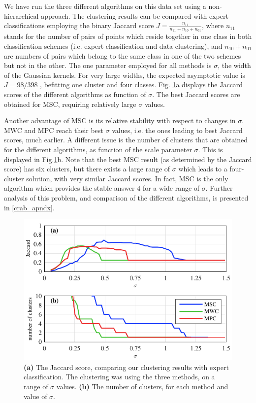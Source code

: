 \documentclass[preprint,12pt]{elsarticle}
\begin{document}
We have run the three different algorithms on this data set using a non-hierarchical approach. The clustering results can be compared with expert classifications \cite{ripley1996} employing the binary Jaccard score $J=\frac{n_{11}}{n_{11}+n_{10}+n_{01}}$, where $n_{11}$ stands for the number of pairs of points which reside together in one class in both classification schemes (i.e. expert classification and data clustering), and $n_{10}+n_{01}$ are numbers of pairs which belong to the same class in one of the two schemes but not in the other. The one parameter employed for all methods is $\sigma$, the width of the Gaussian kernels. For very large widths, the expected asymptotic value is $J=98/398$ , befitting one cluster and four classes. Fig. \ref{crabs}a displays the Jaccard scores of the different algorithms as function of $\sigma$. The best Jaccard scores are obtained for MSC, requiring relatively large $\sigma$ values.

Another advantage of MSC is its relative stability with respect to changes in $\sigma$. MWC and MPC reach their best $\sigma$ values, i.e. the ones leading to best Jaccard scores, much earlier. A different issue is the number of clusters that are obtained for the different algorithms, as function of the scale parameter $\sigma$. This is displayed in Fig.\ref{crabs}b. Note that the best MSC result (as determined by the Jaccard score) has six clusters, but there exists a large range of $\sigma$ which leads to a four-cluster solution, with very similar Jaccard scores. In fact, MSC is the only algorithm which provides the stable answer $4$ for a wide range of $\sigma$. Further analysis of this problem, and comparison of the different algorithms, is presented in \ref{crab_apndx}.




\begin{figure}[t]
\centering
\includegraphics[width=0.6\linewidth]{fig3.pdf}
\caption{ \textbf{(a)} The Jaccard score, comparing our clustering results with expert classification. The clustering was using the three methods, on a range of $\sigma$ values. \textbf{(b)} The number of clusters, for each method and value of $\sigma$.}
\label{crabs}
\end{figure}
\end{document}
